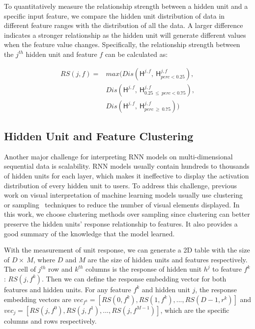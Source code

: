 To quantitatively measure the relationship strength between a hidden unit and a specific input feature, we compare the hidden unit distribution of data in different feature ranges with the distribution of all the data.
A larger difference indicates a stronger relationship as the hidden unit will generate different values when the feature value changes.
Specifically, the relationship strength between the $j^{th}$ hidden unit and feature $f$ can be calculated as:

\begin{equation}
    \label{equation:qualify_response}
    \begin{split}
    RS(j, f) = & max(Dis(\mathsf{H}^{j, f},~\mathsf{H}_{perc<0.25}^{j, f}), \\ 
    & Dis(\mathsf{H}^{j, f},~\mathsf{H}_{0.25~\leq~perc<0.75}^{j, f}), \\ 
    & Dis(\mathsf{H}^{j, f},~\mathsf{H}_{perc~\geq~0.75}^{j, f}))
    \end{split}
\end{equation}



\subsection{Hidden Unit and Feature Clustering} \label{section:clustering}
Another major challenge for interpreting RNN models on multi-dimensional sequential data is scalability.
RNN models usually contain hundreds to thousands of hidden units for each layer, which makes it ineffective to display the activation distribution of every hidden unit to users.
To address this challenge, previous work on visual interpretation of machine learning models usually use clustering~\cite{ming2017understanding, liu2017towards} or sampling~\cite{pezzotti2018deepeyes} techniques to reduce the number of visual elements displayed.
In this work, we choose clustering methods over sampling since clustering can better preserve the hidden units' response relationship to features. It also provides a good summary of the knowledge that the model learned. 

With the measurement of unit response, we can generate a 2D table with the size of $D \times\ M$, where $D$ and $M$ are the size of hidden units and features respectively. The cell of $j^{th}$ row and $k^{th}$ columns is the response of hidden unit $h^j$ to feature $f^k$: $RS(j,f^k)$. Then we can define the response embedding vector for both features and hidden units. For any feature $f^k$ and hidden unit $j$, the response embedding vectors are $vec_{f^k}= [RS(0, f^k), RS(1, f^k), ..., RS(D-1, r^k)]$ and $vec_{j}= [RS(j, f^0), RS(j, f^1), ..., RS(j, f^{M-1})]$, which are the specific columns and rows respectively. 


